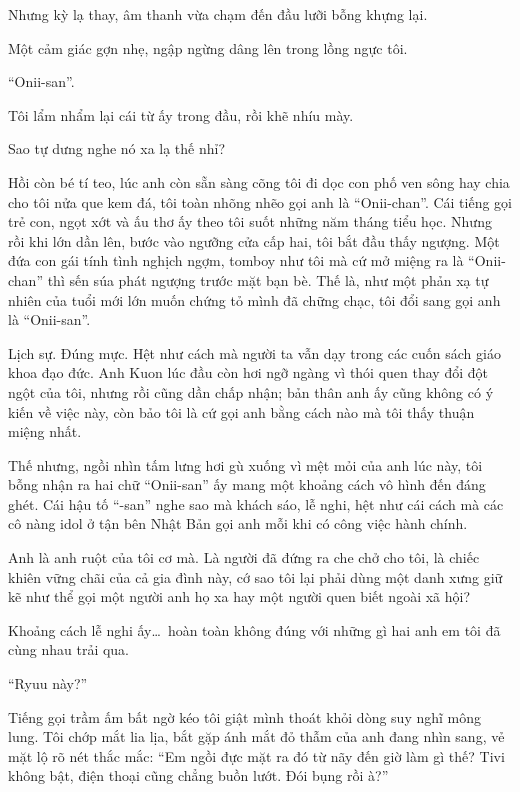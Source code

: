 \documentclass[../main.tex]{subfiles}
\begin{document}
Nhưng kỳ lạ thay, âm thanh vừa chạm đến đầu lưỡi bỗng khựng lại.

Một cảm giác gợn nhẹ, ngập ngừng dâng lên trong lồng ngực tôi.

``Onii-san''.

Tôi lẩm nhẩm lại cái từ ấy trong đầu, rồi khẽ nhíu mày.

Sao tự dưng nghe nó xa lạ thế nhỉ?

Hồi còn bé tí teo, lúc anh còn sẵn sàng cõng tôi đi dọc con phố ven sông hay chia cho tôi nửa que kem đá, tôi toàn nhõng nhẽo gọi anh là ``Onii-chan''. Cái tiếng gọi trẻ con, ngọt xớt và ấu thơ ấy theo tôi suốt những năm tháng tiểu học. Nhưng rồi khi lớn dần lên, bước vào ngưỡng cửa cấp hai, tôi bắt đầu thấy ngượng. Một đứa con gái tính tình nghịch ngợm, tomboy như tôi mà cứ mở miệng ra là ``Onii-chan'' thì sến súa phát ngượng trước mặt bạn bè. Thế là, như một phản xạ tự nhiên của tuổi mới lớn muốn chứng tỏ mình đã chững chạc, tôi đổi sang gọi anh là ``Onii-san''.

Lịch sự. Đúng mực. Hệt như cách mà người ta vẫn dạy trong các cuốn sách giáo khoa đạo đức. Anh Kuon lúc đầu còn hơi ngỡ ngàng vì thói quen thay đổi đột ngột của tôi, nhưng rồi cũng dần chấp nhận; bản thân anh ấy cũng không có ý kiến về việc này, còn bảo tôi là cứ gọi anh bằng cách nào mà tôi thấy thuận miệng nhất.

Thế nhưng, ngồi nhìn tấm lưng hơi gù xuống vì mệt mỏi của anh lúc này, tôi bỗng nhận ra hai chữ ``Onii-san'' ấy mang một khoảng cách vô hình đến đáng ghét. Cái hậu tố ``-san'' nghe sao mà khách sáo, lễ nghi, hệt như cái cách mà các cô nàng idol ở tận bên Nhật Bản gọi anh mỗi khi có công việc hành chính.

Anh là anh ruột của tôi cơ mà. Là người đã đứng ra che chở cho tôi, là chiếc khiên vững chãi của cả gia đình này, cớ sao tôi lại phải dùng một danh xưng giữ kẽ như thể gọi một người anh họ xa hay một người quen biết ngoài xã hội?

Khoảng cách lễ nghi ấy\dots\ hoàn toàn không đúng với những gì hai anh em tôi đã cùng nhau trải qua.

\ct

``Ryuu này?''

Tiếng gọi trầm ấm bất ngờ kéo tôi giật mình thoát khỏi dòng suy nghĩ mông lung. Tôi chớp mắt lia lịa, bắt gặp ánh mắt đỏ thẫm của anh đang nhìn sang, vẻ mặt lộ rõ nét thắc mắc: ``Em ngồi đực mặt ra đó từ nãy đến giờ làm gì thế? Tivi không bật, điện thoại cũng chẳng buồn lướt. Đói bụng rồi à?''
\end{document}
